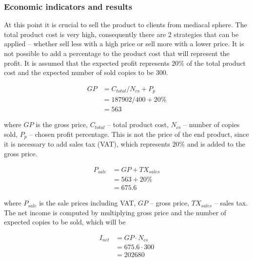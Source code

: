 \subsubsection{Economic indicators and results}
At this point it is crucial to sell the product to clients from mediacal sphere. The total product cost is very high, consequently there are 2 strategies that can be applied -- whether sell less with a high price or sell more with a lower price. It is not possible to add a percentage to the product cost that will represent the profit. It is assumed that the expected profit represents $20\%$ of the total product cost and the expected number of sold copies to be 300.

\begin{equation}
 \begin{split}
  GP &= C_{total} / N_{cs} + P_{p}\\
              &= 187902/400 + 20\% \\
              &= 563
 \end{split}
\end{equation}

\noindent
where $GP$ is the gross price, $C_{total}$ -- total product cost, $N_{cs}$ -- number of copies sold, $P_{p}$ -- chosen profit percentage. This is not the price of the end product, since it is necessary to add sales tax (VAT), which represents $20\%$ and is added to the gross price. 

\begin{equation}
 \begin{split}
  P_{sale} &= GP + TX_{sales}\\
              &= 563 + 20\% \\
              &= 675.6
 \end{split}
\end{equation}

\noindent
where $P_{sale}$ is the sale prices including VAT, $GP$ -- gross price, $TX_{sales}$ -- sales tax. The net income is computed by multiplying gross price and the number of expected copies to be sold, which will be

\begin{equation}
 \begin{split}
  I_{net} &= GP \cdot N_{cs}\\
              &= 675.6  \cdot 300 \\
              &= 202680
 \end{split}
\end{equation}

